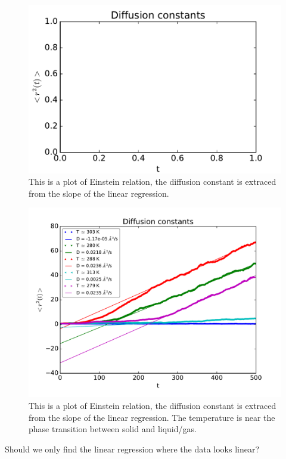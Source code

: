\begin{figure}[H]
\center
\includegraphics[width=0.8\linewidth]{../figures/diffusion_constants_high}\caption{This is a plot of Einstein relation, the diffusion constant is extraced from the slope of the linear regression.}\label{fig:diffusion_high}
\end{figure}

\begin{figure}[H]
\center
\includegraphics[width=0.8\linewidth]{../figures/diffusion_constants}\caption{This is a plot of Einstein relation, the diffusion constant is extraced from the slope of the linear regression. The temperature is near the phase transition between solid and liquid/gas.}\label{fig:diffusion_near_Tc}
\end{figure}


Should we only find the linear regression where the data looks linear?

